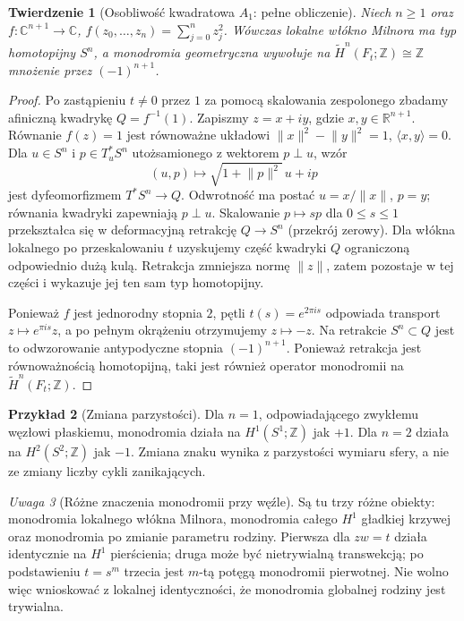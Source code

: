 \documentclass[11pt,a4paper,oneside]{report}
\newcommand{\R}{\mathbb{R}}
\newcommand{\C}{\mathbb{C}}
\newcommand{\Z}{\mathbb{Z}}
\theoremstyle{plain}
\newtheorem{twierdzenie}{Twierdzenie}[section]
\theoremstyle{definition}
\newtheorem{przyklad}[twierdzenie]{Przykład}
\theoremstyle{remark}
\newtheorem{uwaga}[twierdzenie]{Uwaga}
\begin{document}
\begin{twierdzenie}[Osobliwość kwadratowa $A_1$: pełne obliczenie]
\label{thm:a1-monodromy-xiv}
Niech $n\ge1$ oraz
$f:\C^{n+1}\to\C$,
$f(z_0,\dots,z_n)=\sum_{j=0}^nz_j^2$.
Wówczas lokalne włókno Milnora ma typ homotopijny $S^n$,
a monodromia geometryczna wywołuje na
$\widetilde H^n(F_t;\Z)\cong\Z$ mnożenie przez
$(-1)^{n+1}$.
\end{twierdzenie}
\begin{proof}
Po zastąpieniu $t\ne0$ przez $1$ za pomocą
skalowania zespolonego zbadamy afiniczną
kwadrykę $Q=f^{-1}(1)$. Zapiszmy $z=x+iy$,
gdzie $x,y\in\R^{n+1}$. Równanie $f(z)=1$
jest równoważne układowi
$\lVert x\rVert^2-\lVert y\rVert^2=1$,
$\langle x,y\rangle=0$.
Dla $u\in S^n$ i $p\in T_u^*S^n$ utożsamionego
z wektorem $p\perp u$, wzór
\[
(u,p)\longmapsto\sqrt{1+\lVert p\rVert^2}\,u+ip
\]
jest dyfeomorfizmem $T^*S^n\to Q$.
Odwrotność ma postać
$u=x/\lVert x\rVert$, $p=y$;
równania kwadryki zapewniają $p\perp u$.
Skalowanie $p\mapsto sp$ dla $0\le s\le1$
przekształca się w deformacyjną retrakcję
$Q\to S^n$ (przekrój zerowy).
Dla włókna lokalnego po przeskalowaniu $t$
uzyskujemy część kwadryki $Q$ ograniczoną
odpowiednio dużą kulą. Retrakcja zmniejsza
normę $\lVert z\rVert$, zatem pozostaje w tej
części i wykazuje jej ten sam typ homotopijny.

Ponieważ $f$ jest jednorodny stopnia $2$,
pętli $t(s)=e^{2\pi is}$ odpowiada transport
$z\mapsto e^{\pi is}z$, a po pełnym okrążeniu
otrzymujemy $z\mapsto-z$. Na retrakcie
$S^n\subset Q$ jest to odwzorowanie
antypodyczne stopnia $(-1)^{n+1}$.
Ponieważ retrakcja jest równoważnością
homotopijną, taki jest również operator
monodromii na $\widetilde H^n(F_t;\Z)$.
\end{proof}
\begin{przyklad}[Zmiana parzystości]
Dla $n=1$, odpowiadającego zwykłemu węzłowi
płaskiemu, monodromia działa na $H^1(S^1;\Z)$
jak $+1$. Dla $n=2$ działa na
$H^2(S^2;\Z)$ jak $-1$. Zmiana znaku wynika z
parzystości wymiaru sfery, a nie ze zmiany
liczby cykli zanikających.
\end{przyklad}

\begin{uwaga}[Różne znaczenia monodromii przy węźle]
Są tu trzy różne obiekty: monodromia lokalnego włókna Milnora,
monodromia całego $H^1$ gładkiej krzywej oraz monodromia
po zmianie parametru rodziny. Pierwsza dla $zw=t$ działa
identycznie na $H^1$ pierścienia; druga może być
nietrywialną transwekcją; po podstawieniu $t=s^m$
trzecia jest $m$-tą potęgą monodromii pierwotnej.
Nie wolno więc wnioskować z lokalnej identyczności, że
monodromia globalnej rodziny jest trywialna.
\end{uwaga}
\end{document}
